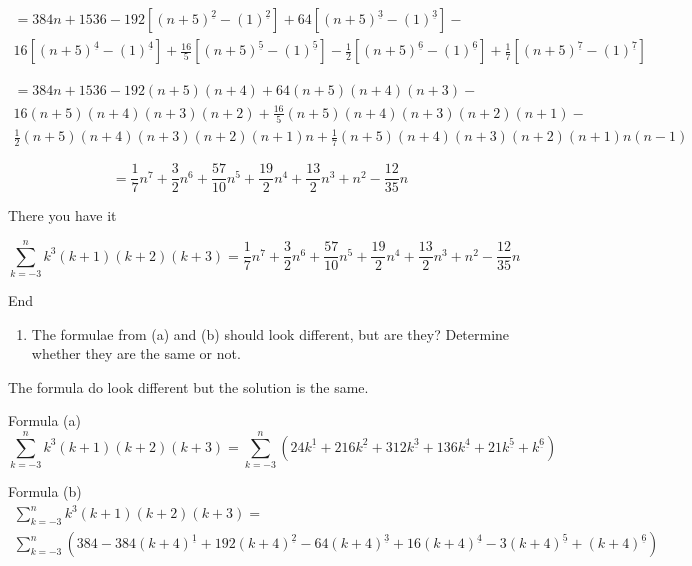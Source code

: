 \documentclass[10pt, AMS Euler]{article}
\begin{document}
\begin{enumerate}[resume]
                \begin{multline*}
                    = 384n+1536 - 192[(n+5)^{\underline{2}} - (1)^{\underline{2}}] + 64[(n+5)^{\underline{3}} - (1)^{\underline{3}}] - \\ 16[(n+5)^{\underline{4}} - (1)^{\underline{4}}] + \frac{16}{5}[(n+5)^{\underline{5}} - (1)^{\underline{5}}] - \frac{1}{2}[(n+5)^{\underline{6}} - (1)^{\underline{6}}] + \frac{1}{7}[(n+5)^{\underline{7}} - (1)^{\underline{7}}]
                \end{multline*}

                \begin{multline*}
                    = 384n+1536 - 192(n+5)(n+4) + 64(n+5)(n+4)(n+3) - \\ 16(n+5)(n+4)(n+3)(n+2) + \frac{16}{5}(n+5)(n+4)(n+3)(n+2)(n+1) - \\ \frac{1}{2}(n+5)(n+4)(n+3)(n+2)(n+1)n + \frac{1}{7}(n+5)(n+4)(n+3)(n+2)(n+1)n(n-1)
                \end{multline*}

                $$ = \frac{1}{7}n^7+\frac{3}{2}n^6+\frac{57}{10}n^5+\frac{19}{2}n^4+\frac{13}{2}n^3+n^2-\frac{12}{35}n$$

                There you have it

                $$\sum_{k = -3}^n k^3(k+1)(k+2)(k+3) = \frac{1}{7}n^7+\frac{3}{2}n^6+\frac{57}{10}n^5+\frac{19}{2}n^4+\frac{13}{2}n^3+n^2-\frac{12}{35}n$$
                
                End
            
            \newpage
            \begin{enumerate}[resume]
            \item The formulae from (a) and (b) should look different, but are they?  Determine whether they are the same or not.
    	\end{enumerate}

                The formula do look different but the solution is the same.

                Formula (a)
                $$\sum_{k = -3}^n k^3(k+1)(k+2)(k+3) = \sum_{k = -3}^n (24k^{\underline{1}} + 216k^{\underline{2}} + 312k^{\underline{3}} + 136k^{\underline{4}} + 21k^{\underline{5}} + k^{\underline{6}}) $$
                
                Formula (b)
                \begin{multline*}
                    \sum_{k = -3}^n k^3(k+1)(k+2)(k+3) = \\ \sum_{k = -3}^n (384 -384(k+4)^{\underline{1}} + 192(k+4)^{\underline{2}} -64(k+4)^{\underline{3}} + 16(k+4)^{\underline{4}} -3(k+4)^{\underline{5}} + (k+4)^{\underline{6}})
                \end{multline*}


\end{enumerate}
\end{document}
